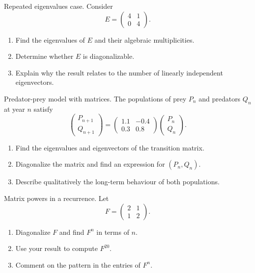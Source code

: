 \documentclass[11pt]{article}
\def\textbf#1{#1}%
\newcounter{question}
\begin{document}
\begin{question}
\textbf{Repeated eigenvalues case.}
Consider 
\[
E = \begin{pmatrix} 4 & 1 \\ 0 & 4 \end{pmatrix}.
\]
\begin{enumerate}
    \item Find the eigenvalues of $E$ and their algebraic multiplicities.
    \item Determine whether $E$ is diagonalizable.
    \item Explain why the result relates to the number of linearly independent eigenvectors.
\end{enumerate}
\end{question}

\begin{question}
\textbf{Predator-prey model with matrices.}
The populations of prey $P_n$ and predators $Q_n$ at year $n$ satisfy
\[
\begin{pmatrix} P_{n+1} \\ Q_{n+1} \end{pmatrix} =
\begin{pmatrix} 1.1 & -0.4 \\ 0.3 & 0.8 \end{pmatrix}
\begin{pmatrix} P_n \\ Q_n \end{pmatrix}.
\]
\begin{enumerate}
    \item Find the eigenvalues and eigenvectors of the transition matrix.
    \item Diagonalize the matrix and find an expression for $(P_n, Q_n)$.
    \item Describe qualitatively the long-term behaviour of both populations.
\end{enumerate}
\end{question}

\begin{question}
\textbf{Matrix powers in a recurrence.}
Let 
\[
F = \begin{pmatrix} 2 & 1 \\ 1 & 2 \end{pmatrix}.
\]
\begin{enumerate}
    \item Diagonalize $F$ and find $F^{n}$ in terms of $n$.
    \item Use your result to compute $F^{20}$.
    \item Comment on the pattern in the entries of $F^{n}$.
\end{enumerate}
\end{question}
\end{document}
